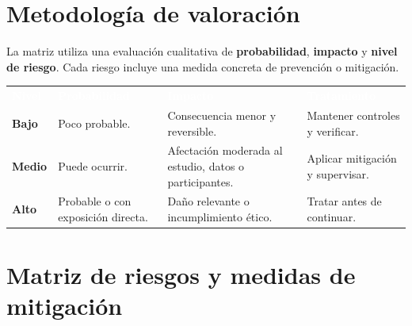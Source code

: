 \documentclass[11pt,a4paper]{article}
\begin{document}
\begin{landscape}
\thispagestyle{fancy}

\section{Metodología de valoración}

La matriz utiliza una evaluación cualitativa de \textbf{probabilidad}, \textbf{impacto} y \textbf{nivel de riesgo}. Cada riesgo incluye una medida concreta de prevención o mitigación.

\scriptsize
\begin{center}
\begin{tabularx}{0.96\linewidth}{L{2.5cm} Y Y Y}
\textcolor{white}{\textbf{Nivel}} &
\textcolor{white}{\textbf{Probabilidad}} &
\textcolor{white}{\textbf{Impacto}} &
\textcolor{white}{\textbf{Tratamiento}}\\
\textcolor{RTGreen}{\textbf{Bajo}} & Poco probable. & Consecuencia menor y reversible. & Mantener controles y verificar.\\
\textcolor{RTAmber}{\textbf{Medio}} & Puede ocurrir. & Afectación moderada al estudio, datos o participantes. & Aplicar mitigación y supervisar.\\
\textcolor{RTRed}{\textbf{Alto}} & Probable o con exposición directa. & Daño relevante o incumplimiento ético. & Tratar antes de continuar.\\
\end{tabularx}
\end{center}

\section{Matriz de riesgos y medidas de mitigación}


\end{landscape}
\end{document}
